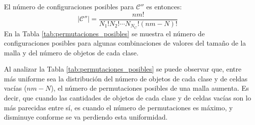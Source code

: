 El número de configuraciones posibles para $\mathcal{C}''$ es entonces:
%
\begin{equation}
	\label{eq:complejidad_7}
	|\mathcal{C}''| = \frac{nm!}{N_1!N_2! \cdots N_{N_C}!(nm - N)!}
\end{equation}
%
En la Tabla \ref{tab:permutaciones_posibles} se muestra el número de configuraciones posibles para algunas combinaciones de valores del tamaño de la malla y del número de objetos de cada clase.
%
\begin{table}[H]
	\renewcommand{\arraystretch}{1.4}%
	\captionsetup{width=\tablewidth}%
	\caption{Número de permutaciones de arreglos posibles en función del número de elementos de cada clase presentes en la malla y del tamaño de la malla.}%
	\label{tab:permutaciones_posibles}%
\end{table}
%
Al analizar la Tabla \ref{tab:permutaciones_posibles} se puede observar que, entre más uniforme sea la distribución del número de objetos de cada clase y de celdas vacías ($nm - N$), el número de permutaciones posibles de una malla aumenta.
Es decir, que cuando las cantidades de objetos de cada clase y de celdas vacías son lo más parecidas entre sí, es cuando el número de permutaciones es máximo, y disminuye conforme se va perdiendo esta uniformidad.
%
%
